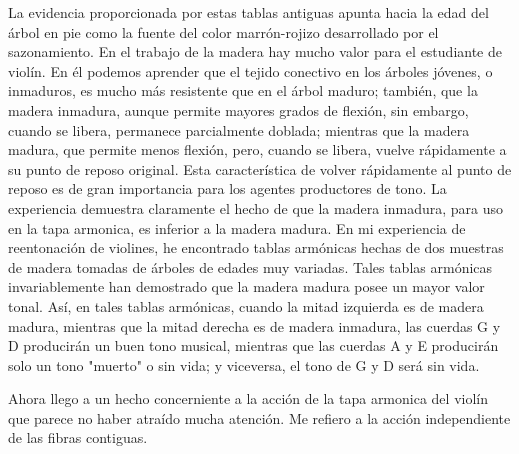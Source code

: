 \documentclass[12pt]{book}
\begin{document}
La evidencia proporcionada por estas tablas antiguas apunta hacia la edad del árbol en pie como la fuente del color marrón-rojizo desarrollado por el sazonamiento. En el trabajo de la madera hay mucho valor para el estudiante de violín. En él podemos aprender que el tejido conectivo en los árboles jóvenes, o inmaduros, es mucho más resistente que en el árbol maduro; también, que la madera inmadura, aunque permite mayores grados de flexión, sin embargo, cuando se libera, permanece parcialmente doblada; mientras que la madera madura, que permite menos flexión, pero, cuando se libera, vuelve rápidamente a su punto de reposo original. Esta característica de volver rápidamente al punto de reposo es de gran importancia para los agentes productores de tono. La experiencia demuestra claramente el hecho de que la madera inmadura, para uso en la tapa armonica, es inferior a la madera madura. En mi experiencia de reentonación de violines, he encontrado tablas armónicas hechas de dos muestras de madera tomadas de árboles de edades muy variadas. Tales tablas armónicas invariablemente han demostrado que la madera madura posee un mayor valor tonal. Así, en tales tablas armónicas, cuando la mitad izquierda es de madera madura, mientras que la mitad derecha es de madera inmadura, las cuerdas G y D producirán un buen tono musical, mientras que las cuerdas A y E producirán solo un tono "muerto" o sin vida; y viceversa, el tono de G y D será sin vida.

Ahora llego a un hecho concerniente a la acción de la tapa armonica del violín que parece no haber atraído mucha atención. Me refiero a la acción independiente de las fibras contiguas.
\end{document}
